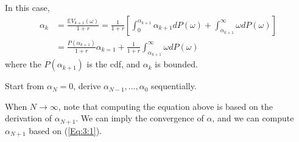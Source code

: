 In this case,
\begin{equation}\label{Eq:3:1}
\begin{aligned}
\alpha_k &= \frac{\mathbb{E}V_{k+1}(\omega)}{1+r}
=
\frac{1}{1+r}
\left[\int_0^{\alpha_{k+1}}\alpha_{k+1}d P(\omega)
+
\int_{\alpha_{k+1}}^\infty \omega d P(\omega)
\right]\\
&=\frac{P(\alpha_{k+1})}{1+r}\alpha_{k=1}
+
\frac{1}{1+r}\int_{\alpha_{k+1}}^\infty\omega d P(\omega)
\end{aligned}
\end{equation}
where the $P(\alpha_{k+1})$ is the cdf, and $\alpha_k$ is bounded.


Start from $\alpha_N=0$, derive $\alpha_{N-1},\dots,\alpha_0$ sequentially.

When $N\to\infty$, note that computing the equation above is based on the derivation of $\alpha_{N+1}$. We can imply the convergence of $\alpha$, and we can compute $\alpha_{N+1}$ based on (\ref{Eq:3:1}).








